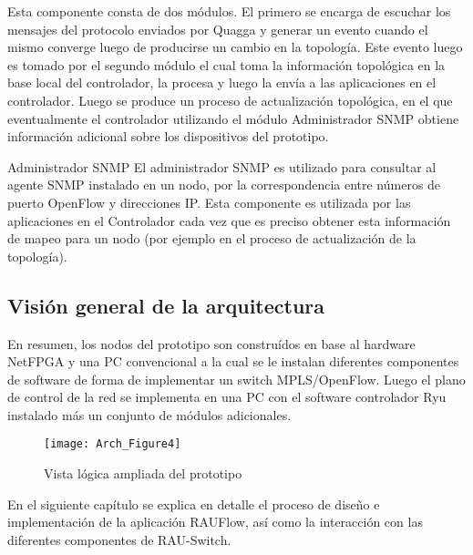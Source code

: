 Esta componente consta de dos módulos. El primero se encarga de escuchar los mensajes del protocolo enviados por Quagga y generar un evento cuando el mismo converge luego de producirse un cambio en la topolog\'ia. Este evento luego es tomado por el segundo m\'odulo el cual toma la información topol\'ogica en la base local del controlador, la procesa y luego la env\'ia a las aplicaciones en el controlador. Luego se produce un proceso de actualizaci\'on topol\'ogica, en el que eventualmente el controlador utilizando el m\'odulo Administrador SNMP obtiene informaci\'on adicional sobre los dispositivos del prototipo. 

\begin{subsection}{Administrador SNMP}
El administrador SNMP es utilizado para consultar al agente SNMP instalado en un nodo, por la correspondencia entre números de puerto OpenFlow y direcciones IP. Esta componente es utilizada por las aplicaciones en el Controlador cada vez que es preciso obtener esta información de mapeo para un nodo (por ejemplo en el proceso de actualización de la topolog\'ia).

\end{subsection}

\subsection{Visi\'on general de la arquitectura}

En resumen, los nodos del prototipo son constru\'idos en base al hardware NetFPGA y una PC convencional a la cual se le instalan diferentes componentes de software de forma de implementar un switch MPLS/OpenFlow. Luego el plano de control de la red se implementa en una PC con el software controlador Ryu instalado m\'as un conjunto de m\'odulos adicionales.\\

\begin{figure}[h!] 
\centering    
\texttt{[image: Arch\_Figure4]}
\caption[Vista l\'ogica ampliada del prototipo]{Vista l\'ogica ampliada del prototipo}
\label{fig:OpenSourceRArch4}
\end{figure}

En el siguiente cap\'itulo se explica en detalle el proceso de diseño e implementaci\'on de la aplicaci\'on RAUFlow, as\'i como la interacci\'on con las diferentes componentes de RAU-Switch.
